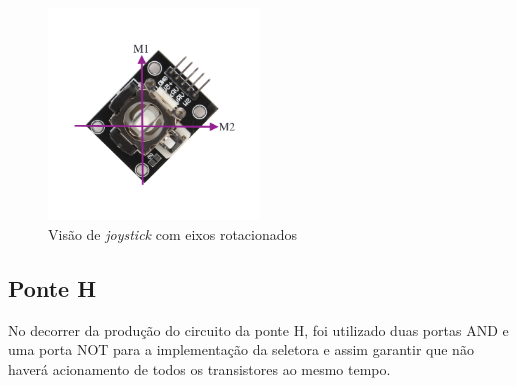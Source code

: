     \begin{figure}[!ht]
      \center
      \includegraphics[width=0.5\textwidth]{figuras/resultados/joy_m1m2}
      \caption{Visão de \textit{joystick} com eixos rotacionados}
      \label{fig:joy_m1m2}
    \end{figure}

\subsection{Ponte H}

No decorrer da produção do circuito da ponte H, foi utilizado duas portas AND e uma porta NOT para a implementação da seletora e assim garantir que não haverá acionamento de todos os transistores ao mesmo tempo.

